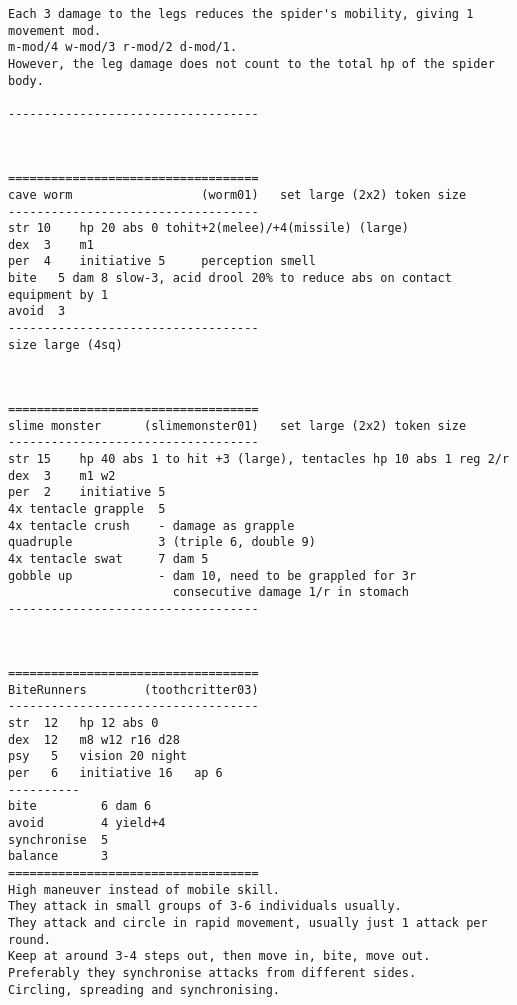 \begin{samepage}
\begin{verbatim}
Each 3 damage to the legs reduces the spider's mobility, giving 1 movement mod.
m-mod/4 w-mod/3 r-mod/2 d-mod/1.
However, the leg damage does not count to the total hp of the spider body.

-----------------------------------
\end{verbatim} \normalsize \end{samepage}

\

\goodbreak \begin{samepage} \small \begin{verbatim}
===================================
cave worm                  (worm01)   set large (2x2) token size
-----------------------------------
str 10    hp 20 abs 0 tohit+2(melee)/+4(missile) (large)
dex  3    m1
per  4    initiative 5     perception smell
bite   5 dam 8 slow-3, acid drool 20% to reduce abs on contact equipment by 1
avoid  3
-----------------------------------
size large (4sq)
\end{verbatim} \normalsize \end{samepage}

\

\goodbreak \begin{samepage} \small \begin{verbatim}
===================================
slime monster      (slimemonster01)   set large (2x2) token size
-----------------------------------
str 15    hp 40 abs 1 to hit +3 (large), tentacles hp 10 abs 1 reg 2/r
dex  3    m1 w2
per  2    initiative 5
4x tentacle grapple  5
4x tentacle crush    - damage as grapple
quadruple            3 (triple 6, double 9)
4x tentacle swat     7 dam 5
gobble up            - dam 10, need to be grappled for 3r
                       consecutive damage 1/r in stomach
-----------------------------------
\end{verbatim} \normalsize \end{samepage}

\

\goodbreak \begin{samepage} \small \begin{verbatim}
===================================
BiteRunners        (toothcritter03)
-----------------------------------
str  12   hp 12 abs 0
dex  12   m8 w12 r16 d28
psy   5   vision 20 night
per   6   initiative 16   ap 6
----------
bite         6 dam 6
avoid        4 yield+4
synchronise  5
balance      3
===================================
High maneuver instead of mobile skill.
They attack in small groups of 3-6 individuals usually.
They attack and circle in rapid movement, usually just 1 attack per round.
Keep at around 3-4 steps out, then move in, bite, move out.
Preferably they synchronise attacks from different sides.
Circling, spreading and synchronising.
\end{verbatim} \normalsize \end{samepage}

